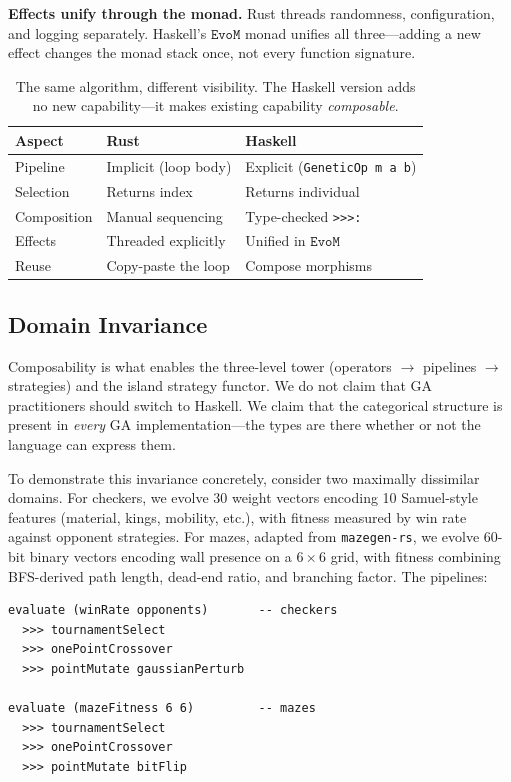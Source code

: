 \documentclass[dvipsnames,format=sigconf,anonymous=true,review=true]{acmart}
\newcommand{\EvoM}{\texttt{EvoM}}
\begin{document}
\textbf{Effects unify through the monad.} Rust threads randomness, configuration, and logging separately. Haskell's $\EvoM$ monad unifies all three---adding a new effect changes the monad stack once, not every function signature.

\begin{table}[ht]
\centering
\caption{The same algorithm, different visibility. The Haskell version adds no new capability---it makes existing capability \emph{composable}.}
\label{tab:rust-haskell}
\small
\begin{tabular}{@{}lll@{}}
\toprule
\textbf{Aspect} & \textbf{Rust} & \textbf{Haskell} \\
\midrule
Pipeline    & Implicit (loop body)      & Explicit (\texttt{GeneticOp m a b}) \\
Selection   & Returns index             & Returns individual \\
Composition & Manual sequencing         & Type-checked \texttt{>{>}{>}:} \\
Effects     & Threaded explicitly       & Unified in $\EvoM$ \\
Reuse       & Copy-paste the loop       & Compose morphisms \\
\bottomrule
\end{tabular}
\end{table}

\subsection{Domain Invariance}

Composability is what enables the three-level tower (operators $\to$ pipelines $\to$ strategies) and the island strategy functor. We do not claim that GA practitioners should switch to Haskell. We claim that the categorical structure is present in \emph{every} GA implementation---the types are there whether or not the language can express them.

To demonstrate this invariance concretely, consider two maximally dissimilar domains. For checkers, we evolve 30 weight vectors encoding 10 Samuel-style features (material, kings, mobility, etc.), with fitness measured by win rate against opponent strategies. For mazes, adapted from \texttt{mazegen-rs}, we evolve 60-bit binary vectors encoding wall presence on a $6 \times 6$ grid, with fitness combining BFS-derived path length, dead-end ratio, and branching factor. The pipelines:

\begin{lstlisting}[style=plainstyle]
evaluate (winRate opponents)       -- checkers
  >>> tournamentSelect
  >>> onePointCrossover
  >>> pointMutate gaussianPerturb

evaluate (mazeFitness 6 6)         -- mazes
  >>> tournamentSelect
  >>> onePointCrossover
  >>> pointMutate bitFlip
\end{lstlisting}
\end{document}

